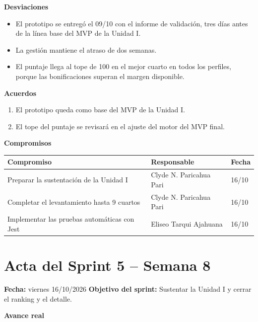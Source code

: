\documentclass[11pt,a4paper]{article}
\begin{document}
\vspace{0.1cm}
\noindent\textbf{Desviaciones}
\begin{itemize}[leftmargin=*, itemsep=0pt]
    \item El prototipo se entregó el 09/10 con el informe de validación, tres días antes de la línea base del MVP de la Unidad I.
    \item La gestión mantiene el atraso de dos semanas.
    \item El puntaje llega al tope de 100 en el mejor cuarto en todos los perfiles, porque las bonificaciones superan el margen disponible.
\end{itemize}
\noindent\textbf{Acuerdos}
\begin{enumerate}[leftmargin=*, itemsep=0pt]
    \item El prototipo queda como base del MVP de la Unidad I.
    \item El tope del puntaje se revisará en el ajuste del motor del MVP final.
\end{enumerate}
\noindent\textbf{Compromisos}

\vspace{0.05cm}
{\footnotesize
{}
\noindent\begin{tabularx}{\textwidth}{@{}L P{3.6cm} C{1.6cm}@{}}
\toprule
{}
\textbf{Compromiso} & \textbf{Responsable} & \textbf{Fecha} \\
\midrule
Preparar la sustentación de la Unidad I & Clyde N. Paricahua Pari & 16/10 \\
Completar el levantamiento hasta 9 cuartos & Clyde N. Paricahua Pari & 16/10 \\
Implementar las pruebas automáticas con Jest & Eliseo Tarqui Ajahuana & 16/10 \\
\bottomrule
\end{tabularx}
}

\section{Acta del Sprint 5 -- Semana 8}
\noindent\textbf{Fecha:} viernes 16/10/2026 \quad \textbar\quad \textbf{Objetivo del sprint:} Sustentar la Unidad I y cerrar el ranking y el detalle.

\vspace{0.1cm}
\noindent\textbf{Avance real}
\end{document}
